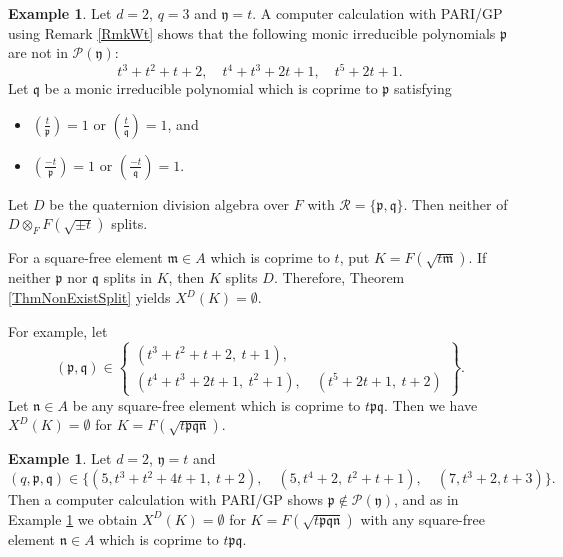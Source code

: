 \documentclass[10pt]{amsart}
\theoremstyle{plain}
\theoremstyle{definition}
\newtheorem{exmp}[thm]{Example}
\newcommand{\cP}{\mathcal{P}}
\newcommand{\cR}{\mathcal{R}}
\newcommand{\frem}{\mathfrak{m}}
\newcommand{\frn}{\mathfrak{n}}
\newcommand{\frp}{\mathfrak{p}}
\newcommand{\frq}{\mathfrak{q}}
\newcommand{\fry}{\mathfrak{y}}
\begin{document}
\begin{exmp}\label{ExNE3}
	Let $d=2$, $q=3$ and $\fry=t$. A computer calculation with PARI/GP using Remark \ref{RmkWt}
	shows that the following monic irreducible polynomials $\frp$ are not in 
	$\cP(\fry)$:
	\[
	t^3 + t^2 + t + 2,\quad t^4 + t^3 + 2t + 1,\quad t^5 + 2t + 1.
	\]
	Let $\frq$ be a monic irreducible polynomial which is coprime to $\frp$ satisfying 
	\begin{itemize}
		\item $(\frac{t}{\frp})=1$ or $(\frac{t}{\frq})=1$, and
		\item $(\frac{-t}{\frp})=1$ or $(\frac{-t}{\frq})=1$.
	\end{itemize}
	Let $D$ be the quaternion division algebra over $F$ with $\cR=\{\frp,\frq\}$.
	Then neither of $D\otimes_F F(\sqrt{\pm t})$ splits.
	
	For a square-free element $\frem\in A$ which is coprime to $t$, put $K=F(\sqrt{t\frem})$.
	If neither $\frp$ nor $\frq$ splits in $K$, then $K$ splits $D$.
	Therefore, Theorem \ref{ThmNonExistSplit} yields $X^D(K)=\emptyset$.
	
	For example, let
	\[
	(\frp,\frq)\in\left\{\begin{gathered}
		(t^3 + t^2 + t + 2,\ t+1),\\
		(t^4 + t^3 + 2t + 1,\ t^2 + 1),\quad (t^5 + 2t + 1,\ t+2) 
	\end{gathered}\right\}.
	\]
	Let $\frn\in A$ be any square-free element which is coprime to $t\frp\frq$. 
	Then we have $X^D(K)=\emptyset$ for $K=F(\sqrt{t\frp\frq\frn})$. 
\end{exmp}

\begin{exmp}\label{ExNE5}
		Let $d=2$, $\fry=t$ and
		\[
			(q,\frp,\frq)\in\{(5,t^3 + t^2 + 4 t + 1,\ t+2),\quad (5,t^4 + 2,\ t^2 + t + 1),\quad (7,t^3+2,t+3)\}.
		\]
		Then a computer calculation with PARI/GP shows $\frp\notin\cP(\fry)$, and as in Example \ref{ExNE3} we obtain	
		$X^D(K)=\emptyset$ for $K=F(\sqrt{t\frp\frq\frn})$ with any square-free element $\frn\in A$ which is coprime to $t\frp\frq$.
\end{exmp}

\end{document}
